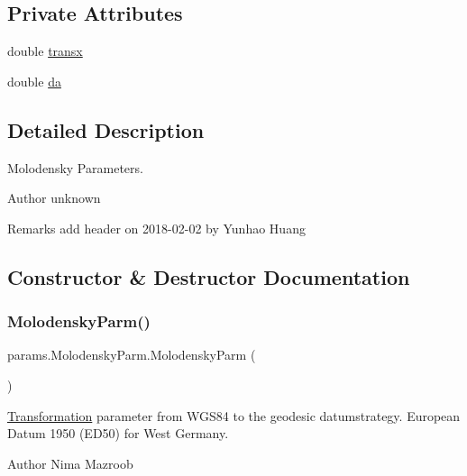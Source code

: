 \subsection*{Private Attributes}
\begin{DoxyCompactItemize}
\item 
double \hyperlink{classparams_1_1_molodensky_parm_a398db3a8717a07b0ba3bead52a2ab328}{transx}
\item 
double \hyperlink{classparams_1_1_molodensky_parm_a1c88f8e58b8c4c702938f7ca54730dfb}{da}
\end{DoxyCompactItemize}


\subsection{Detailed Description}
Molodensky Parameters. 

\begin{DoxyAuthor}{Author}
unknown 
\end{DoxyAuthor}
\begin{DoxyRemark}{Remarks}
add header on 2018-\/02-\/02 by Yunhao Huang 
\end{DoxyRemark}


\subsection{Constructor \& Destructor Documentation}
\mbox{\label{classparams_1_1_molodensky_parm_a991a43b0db63761d8e98f3c22b67ac5e}} 
\subsubsection{\texorpdfstring{Molodensky\+Parm()}{MolodenskyParm()}}
{\footnotesize\ttfamily params.\+Molodensky\+Parm.\+Molodensky\+Parm (\begin{DoxyParamCaption}{ }\end{DoxyParamCaption})}



\hyperlink{class_transformation}{Transformation} parameter from W\+G\+S84 to the geodesic datumstrategy. European Datum 1950 (E\+D50) for West Germany. 

\begin{DoxyAuthor}{Author}
Nima Mazroob 
\end{DoxyAuthor}


